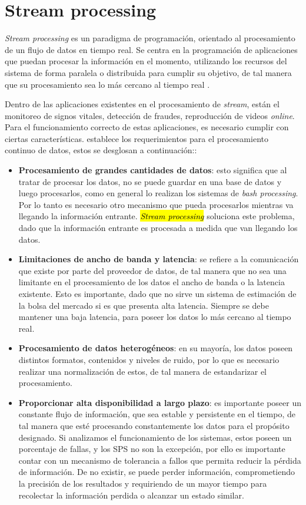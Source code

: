 \section{Stream processing}
\label{sec:streamProcessing}

\textit{Stream processing} es un paradigma de programación, orientado al procesamiento de un flujo de datos en tiempo real. Se centra en la programación de aplicaciones que puedan procesar la información en el momento, utilizando los recursos del sistema de forma paralela o distribuida para cumplir su objetivo, de tal manera que su procesamiento sea lo más cercano al tiempo real \citep{ChakravarthyJ09}.

Dentro de las aplicaciones existentes en el procesamiento de \textit{stream}, están el monitoreo de signos vitales, detección de fraudes, reproducción de videos \textit{online}. Para el funcionamiento correcto de estas aplicaciones, es necesario cumplir con ciertas características. \citep{andrade2014fundamentals} establece los requerimientos para el procesamiento continuo de datos, estos se desglosan a continuación::

\begin{itemize}
	\item \textbf{Procesamiento de grandes cantidades de datos}: esto significa que al tratar de procesar los datos, no se puede guardar en una base de datos y luego procesarlos, como en general lo realizan los sistemas de \textit{bash processing}. Por lo tanto es necesario otro mecanismo que pueda procesarlos mientras va llegando la información entrante. \hl{\textit{Stream processing}} soluciona este problema, dado que la información entrante es procesada a medida que van llegando los datos.
	\item \textbf{Limitaciones de ancho de banda y latencia}: se refiere a la comunicación que existe por parte del proveedor de datos, de tal manera que no sea una limitante en el procesamiento de los datos el ancho de banda o la latencia existente. Esto es importante, dado que no sirve un sistema de estimación de la bolsa del mercado si es que presenta alta latencia. Siempre se debe mantener una baja latencia, para poseer los datos lo más cercano al tiempo real.
	\item \textbf{Procesamiento de datos heterogéneos}: en su mayoría, los datos poseen distintos formatos, contenidos y niveles de ruido, por lo que es necesario realizar una normalización de estos, de tal manera de estandarizar el procesamiento.
	\item \textbf{Proporcionar alta disponibilidad a largo plazo}: es importante poseer un constante flujo de información, que sea estable y persistente en el tiempo, de tal manera que esté procesando constantemente los datos para el propósito designado. Si analizamos el funcionamiento de los sistemas, estos poseen un porcentaje de fallas, y los SPS no son la excepción, por ello es importante contar con un mecanismo de tolerancia a fallos que permita reducir la pérdida de información. De no existir, se puede perder información, comprometiendo la precisión de los resultados y requiriendo de un mayor tiempo para recolectar la información perdida o alcanzar un estado similar.
\end{itemize}

